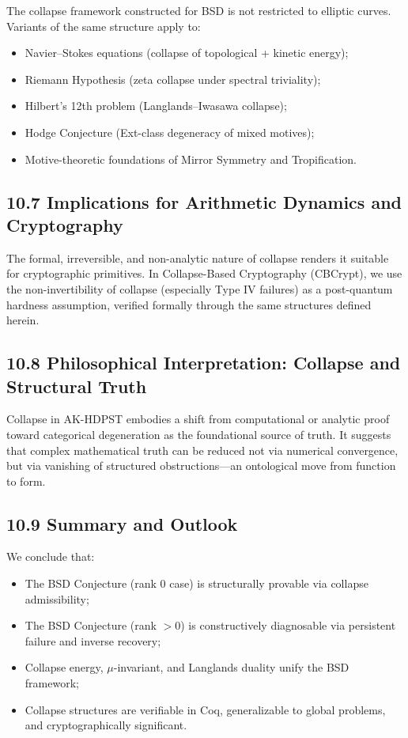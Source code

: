 \documentclass[11pt]{article}
\begin{document}
The collapse framework constructed for BSD is not restricted to elliptic curves. Variants of the same structure apply to:

\begin{itemize}
  \item Navier–Stokes equations (collapse of topological + kinetic energy);
  \item Riemann Hypothesis (zeta collapse under spectral triviality);
  \item Hilbert’s 12th problem (Langlands–Iwasawa collapse);
  \item Hodge Conjecture (Ext-class degeneracy of mixed motives);
  \item Motive-theoretic foundations of Mirror Symmetry and Tropification.
\end{itemize}

\subsection*{10.7 Implications for Arithmetic Dynamics and Cryptography}

The formal, irreversible, and non-analytic nature of collapse renders it suitable for cryptographic primitives. In Collapse-Based Cryptography (CBCrypt), we use the non-invertibility of collapse (especially Type IV failures) as a post-quantum hardness assumption, verified formally through the same structures defined herein.

\subsection*{10.8 Philosophical Interpretation: Collapse and Structural Truth}

Collapse in AK-HDPST embodies a shift from computational or analytic proof toward categorical degeneration as the foundational source of truth. It suggests that complex mathematical truth can be reduced not via numerical convergence, but via vanishing of structured obstructions—an ontological move from function to form.

\subsection*{10.9 Summary and Outlook}

We conclude that:
\begin{itemize}
  \item The BSD Conjecture (rank 0 case) is structurally provable via collapse admissibility;
  \item The BSD Conjecture (rank \(>0\)) is constructively diagnosable via persistent failure and inverse recovery;
  \item Collapse energy, \(\mu\)-invariant, and Langlands duality unify the BSD framework;
  \item Collapse structures are verifiable in Coq, generalizable to global problems, and cryptographically significant.
\end{itemize}
\end{document}
